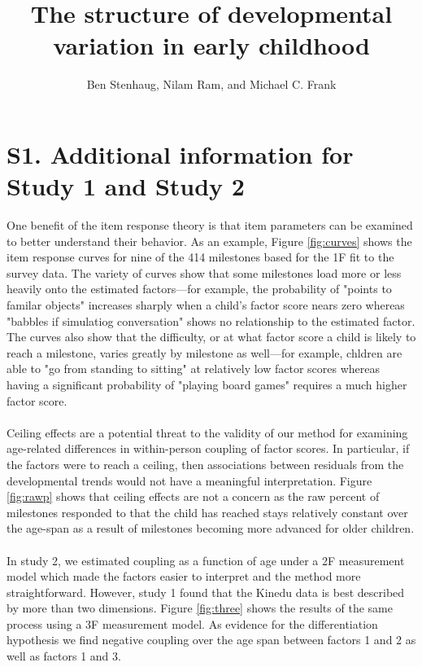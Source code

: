 \documentclass[9pt,twoside,lineno]{pnas-new}
\title{The structure of developmental variation in early childhood}
\author{Ben Stenhaug, Nilam Ram, and Michael C. Frank}
\begin{document}

\maketitle

\SItext

\section*{S1. Additional information for Study 1 and Study 2}

One benefit of the item response theory is that item parameters can be examined to better understand their behavior. As an example, Figure \ref{fig:curves} shows the item response curves for nine of the 414 milestones based for the 1F fit to the survey data. The variety of curves show that some milestones load more or less heavily onto the estimated factors—for example, the probability of "points to familar objects" increases sharply when a child's factor score nears zero whereas "babbles if simulatiog conversation" shows no relationship to the estimated factor. The curves also show that the difficulty, or at what factor score a child is likely to reach a milestone, varies greatly by milestone as well—for example, chldren are able to "go from standing to sitting" at relatively low factor scores whereas having a significant probability of "playing board games" requires a much higher factor score.
\\\\
Ceiling effects are a potential threat to the validity of our method for examining age-related differences in within-person coupling of factor scores. In particular, if the factors were to reach a ceiling, then associations between residuals from the developmental trends would not have a meaningful interpretation. Figure \ref{fig:rawp} shows that ceiling effects are not a concern as the raw percent of milestones responded to that the child has reached stays relatively constant over the age-span as a result of milestones becoming more advanced for older children.
\\\\
In study 2, we estimated coupling as a function of age under a 2F measurement model which made the factors easier to interpret and the method more straightforward. However, study 1 found that the Kinedu data is best described by more than two dimensions. Figure \ref{fig:three} shows the results of the same process using a 3F measurement model. As evidence for the differentiation hypothesis we find negative coupling over the age span between factors 1 and 2 as well as factors 1 and 3.
\end{document}
